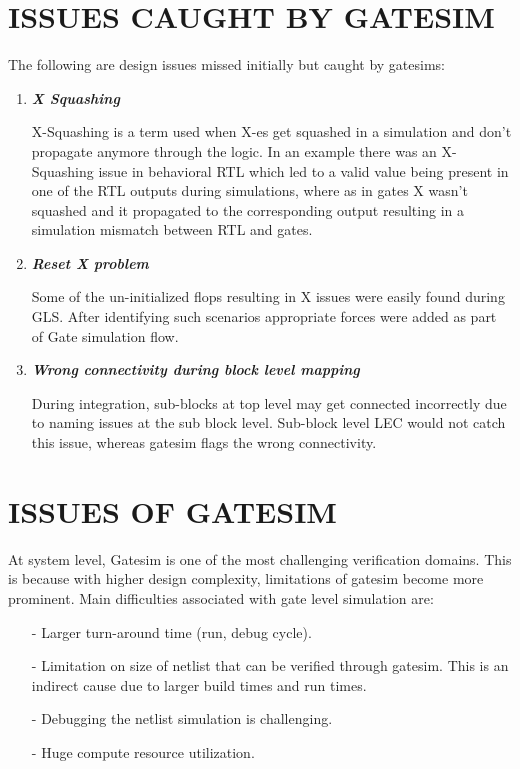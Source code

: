 \section{ISSUES CAUGHT BY GATESIM}
The following are design issues missed initially but caught by gatesims:
\begin{enumerate}
		
	\item \emph{\bf X Squashing}

	X-Squashing is a term used when X-es get squashed in a simulation and don't propagate anymore through the logic. In an example there was an X-Squashing issue in behavioral RTL which led to a valid value being present in one of the RTL outputs during simulations, where as in gates X wasn't squashed and it propagated to the corresponding output resulting in a simulation mismatch between RTL and gates.

	\item \emph{\bf Reset X problem}

	Some of the un-initialized flops resulting in X issues were easily found during GLS.  After identifying such scenarios appropriate forces were added as part of Gate simulation flow.

	\item \emph{\bf Wrong connectivity during block level mapping}

	During integration, sub-blocks at top level may get connected incorrectly due to naming issues at the sub block level. Sub-block level LEC would not catch this issue, whereas gatesim flags the wrong connectivity.
\end{enumerate}







\section{ISSUES OF GATESIM}
At system level, Gatesim is one of the most challenging verification domains. This is because with higher design complexity, limitations of gatesim become more prominent. Main difficulties associated with gate level simulation are:
\begin{itemize}


\item[-] Larger turn-around time (run, debug cycle).
\item[-] Limitation on size of netlist that can be verified through gatesim. This is an indirect cause due to larger build times and run times.
\item[-] Debugging the netlist simulation is challenging.
\item[-] Huge compute resource utilization. 

\end{itemize}
